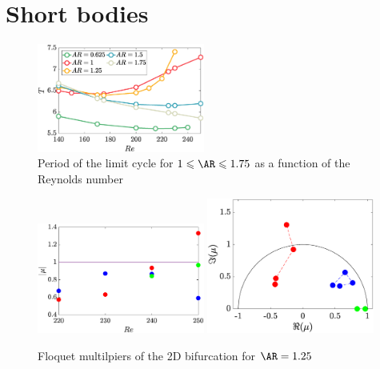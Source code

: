 \section{Short bodies}
\label{sec:short}

\begin{figure}
  \centering
  \includegraphics[width=0.49\textwidth]{./fig/AR1s/T_Re.eps}
  \caption{Period of the limit cycle for $1 \le \AR \le 1.75$ as a function of the Reynolds number}
  \label{fig:T_Re_small}
\end{figure}

\begin{figure}
  \centering
  \includegraphics[width=0.49\textwidth]{./fig/AR1s/mu_Re_Ar1p25_2D.eps}
  \includegraphics[width=0.49\textwidth]{./fig/AR1s/mu_Ar1p25_2D.eps}  
  \caption{Floquet multilpiers of the 2D bifurcation for $\AR=1.25$}
  \label{fig:bif2D_AR1p25}
\end{figure}

